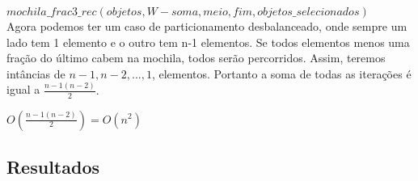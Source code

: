 \documentclass[10pt,a4paper]{article}
\begin{document}
	\hspace{2cm}$mochila\_frac3\_rec(objetos,W - soma,meio,fim, objetos\_selecionados)$\\
	
	
	Agora podemos ter um caso de particionamento desbalanceado, onde sempre um lado tem 1 elemento e o outro tem n-1 elementos. Se todos elementos menos uma fração do último cabem na mochila, todos serão percorridos. Assim, teremos intâncias de $n-1, n-2, ..., 1$, elementos. Portanto a soma de todas as iterações é igual a $\frac{n-1(n-2)}{2}.$
	
	\begin{center}
		$O(\frac{n-1(n-2)}{2}) = O(n^{2})$
	\end{center}
	
	
	
	\subsection*{Resultados}

	\vspace{0.5cm}	
	
\end{document}
